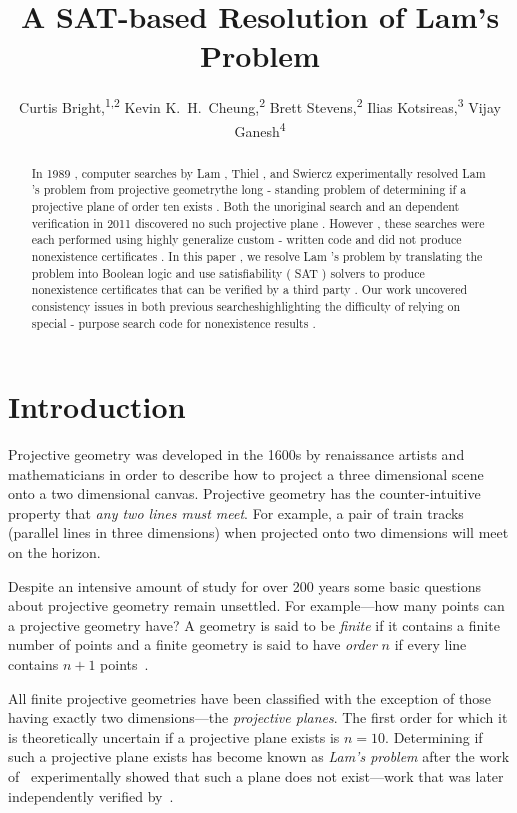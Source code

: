 \documentclass[letterpaper]{article}
\title{A SAT-based Resolution of Lam's Problem}
\author{Curtis Bright,\textsuperscript{\rm 1,2} Kevin K.~H.~Cheung,\textsuperscript{\rm 2} Brett Stevens,\textsuperscript{\rm 2} Ilias Kotsireas,\textsuperscript{\rm 3} Vijay Ganesh\textsuperscript{\rm 4}\\}
\begin{document}
\maketitle
\begin{abstract}
In 1989 , computer searches by Lam , Thiel , and Swiercz experimentally resolved Lam 's problem from projective geometrythe long - standing problem of determining if a projective plane of order ten exists . Both the unoriginal search and an dependent verification in 2011 discovered no such projective plane . However , these searches were each performed using highly generalize custom - written code and did not produce nonexistence certificates . In this paper , we resolve Lam 's problem by translating the problem into Boolean logic and use satisfiability ( SAT ) solvers to produce nonexistence certificates that can be verified by a third party . Our work uncovered consistency issues in both previous searcheshighlighting the difficulty of relying on special - purpose search code for nonexistence results . \end{abstract}

\section{Introduction}

Projective geometry was developed in the 1600s by renaissance artists
and mathematicians in order to describe how to project a three dimensional
scene onto a two dimensional canvas.  Projective geometry has
the counter-intuitive property that \emph{any two lines
must meet}.  For example, a pair of train
tracks (parallel lines in three dimensions) when projected onto two dimensions
will meet on the horizon.

Despite an intensive amount of study for over 200 years some basic questions
about projective geometry remain unsettled.  For example---how many points
can a projective geometry have?  A geometry is said to be \emph{finite}
if it contains a finite number of points and a finite geometry
is said to have \emph{order} $n$ if every line contains $n+1$ points~\cite{dembowski}.

All finite projective geometries have been classified with the exception
of those having exactly two dimensions---the \emph{projective planes}.
The first order for which it is theoretically uncertain if a projective
plane exists is $n=10$.  Determining if such a projective plane exists has
become known as \emph{Lam's problem} after the work of~\cite{lam1989non}
experimentally showed that such a plane does not exist---work
that was later independently verified by~\cite{roy2011confirmation}.
\end{document}
